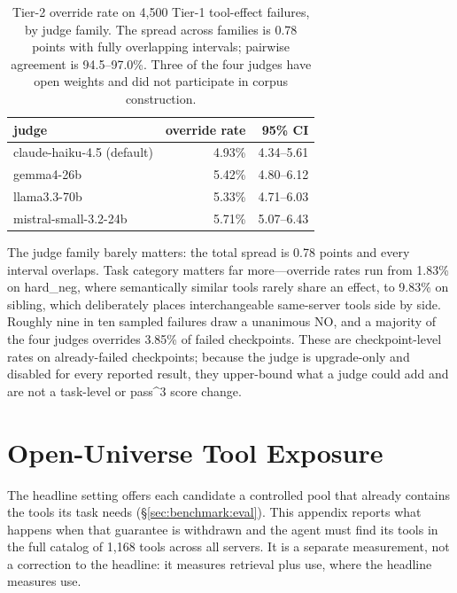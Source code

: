 \begin{table}[h]
  \centering \small
  \begin{tabular}{lrr}
    \toprule
    judge & override rate & 95\% CI \\
    \midrule
    claude-haiku-4.5 (default) & 4.93\% & 4.34--5.61 \\
    gemma4-26b                 & 5.42\% & 4.80--6.12 \\
    llama3.3-70b               & 5.33\% & 4.71--6.03 \\
    mistral-small-3.2-24b      & 5.71\% & 5.07--6.43 \\
    \bottomrule
  \end{tabular}
  \caption{Tier-2 override rate on 4{,}500 Tier-1 tool-effect failures, by judge
    family. The spread across families is 0.78 points with fully overlapping
    intervals; pairwise agreement is 94.5--97.0\%. Three of the four judges have
    open weights and did not participate in corpus construction.}
  \label{tab:tier2}
\end{table}

\noindent The judge family barely matters: the total spread is 0.78 points and
every interval overlaps. Task category matters far more---override rates run from
1.83\% on \textsf{hard\_neg}, where semantically similar tools rarely share an
effect, to 9.83\% on \textsf{sibling}, which deliberately places interchangeable
same-server tools side by side. Roughly nine in ten sampled failures draw a
unanimous \textsf{NO}, and a majority of the four judges overrides 3.85\% of
failed checkpoints. These are checkpoint-level rates on already-failed
checkpoints; because the judge is upgrade-only and disabled for every reported
result, they upper-bound what a judge could add and are not a task-level or
pass\textasciicircum{}3 score change.

\section{Open-Universe Tool Exposure}
\label{app:openuniverse}
The headline setting offers each candidate a controlled pool that already
contains the tools its task needs (\S\ref{sec:benchmark:eval}). This appendix
reports what happens when that guarantee is withdrawn and the agent must find
its tools in the full catalog of 1{,}168 tools across all servers. It is a
separate measurement, not a correction to the headline: it measures retrieval
plus use, where the headline measures use.

